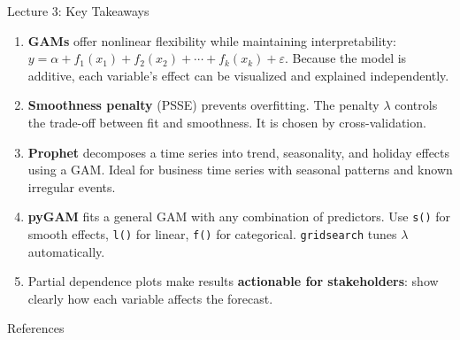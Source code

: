 \documentclass[aspectratio=169, 11pt]{beamer}
\begin{document}
\begin{frame}{Lecture 3: Key Takeaways}
  \begin{keybox}
    {\small
    \begin{enumerate}
      \item \textbf{GAMs} offer nonlinear flexibility while maintaining interpretability:
            $y = \alpha + f_1(x_1) + f_2(x_2) + \cdots + f_k(x_k) + \varepsilon$.
            Because the model is additive, each variable's effect can be visualized
            and explained independently.

      \item \textbf{Smoothness penalty} (PSSE) prevents overfitting.
            The penalty $\lambda$ controls the trade-off between fit and smoothness.
            It is chosen by cross-validation.

      \item \textbf{Prophet} decomposes a time series into trend, seasonality, and
            holiday effects using a GAM. Ideal for business time series with
            seasonal patterns and known irregular events.

      \item \textbf{pyGAM} fits a general GAM with any combination of predictors.
            Use \texttt{s()} for smooth effects, \texttt{l()} for linear,
            \texttt{f()} for categorical. \texttt{gridsearch} tunes $\lambda$ automatically.

      \item Partial dependence plots make results \textbf{actionable for stakeholders}:
            show clearly how each variable affects the forecast.
    \end{enumerate}
    }
  \end{keybox}
\end{frame}

\begin{frame}[allowframebreaks]{References}
  \printbibliography[heading=none]
\end{frame}

\end{document}
